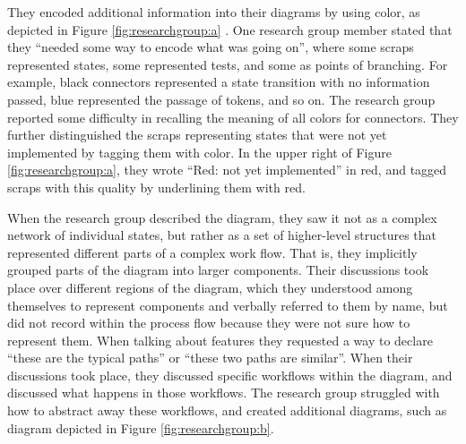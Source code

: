 They encoded additional information into their diagrams by using color, as depicted in Figure \ref{fig:researchgroup:a} . One research group member stated that they ``needed some way to encode what was going on'', where some scraps represented states, some represented tests, and some as points of branching. For example, black connectors represented a state transition with no information passed, blue represented the passage of tokens, and so on. The research group reported some difficulty in recalling the meaning of all colors for connectors. They further distinguished the scraps representing states that were not yet implemented by tagging them with color. In the upper right of Figure \ref{fig:researchgroup:a}, they wrote ``Red: not yet implemented'' in red, and tagged scraps with this quality by underlining them with red. 


When the research group described the diagram, they saw it not as a complex network of individual states, but rather as a set of higher-level structures that represented different parts of a complex work flow. That is, they implicitly grouped parts of the diagram into larger components. Their discussions took place over different regions of the diagram, which they understood among themselves to represent components and verbally referred to them by name, but did not record within the process flow because they were not sure how to represent them. When talking about features they requested a way to declare ``these are the typical paths'' or ``these two paths are similar''. When their discussions took place, they discussed specific workflows within the diagram, and discussed what happens in those workflows. The research group struggled with how to abstract away these workflows, and created additional diagrams, such as diagram depicted in Figure \ref{fig:researchgroup:b}.



